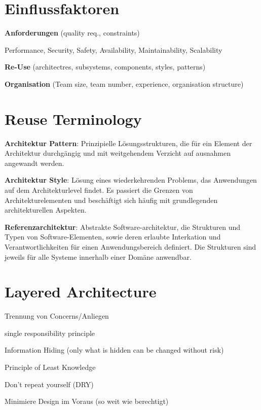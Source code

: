 \section{Einflussfaktoren}
\begin{compactitem}
    \item \textbf{Anforderungen} (quality req., constraints)
    \begin{compactitem}
        \item Performance, Security, Safety, Availability, Maintainability,
        Scalability
    \end{compactitem}
    \item \textbf{Re-Use} (architectres, subsystems, components, styles, patterns)
    \item \textbf{Organisation} (Team size, team number, experience, organisation structure)
\end{compactitem}

\section{Reuse Terminology}
\begin{compactitem}
    \item \textbf{Architektur Pattern}: Prinzipielle Lösungsstrukturen, die für
    ein Element der Architektur durchgängig und mit weitgehendem Verzicht auf
    ausnahmen angewandt werden.
    \item \textbf{Architektur Style}: Lösung eines wiederkehrenden Problems, das
    Anwendungen auf dem Architekturlevel findet. Es passiert die Grenzen von
    Architekturelementen und beschäftigt sich häufig mit grundlegenden architekturellen
    Aspekten.
    \item \textbf{Referenzarchitektur}: Abstrakte Software-architektur, die Strukturen
    und Typen von Software-Elementen, sowie deren erlaubte Interkation und
    Verantwortlichkeiten für einen Anwendungsbereich definiert. Die Strukturen
    sind jeweils für alle Systeme innerhalb einer Domäne anwendbar.
\end{compactitem}

\section{Layered Architecture}
\begin{compactitem}
    \item Trennung von Concerns/Anliegen
    \item single responsibility principle
    \item Information Hiding (only what is hidden can be changed without risk)
    \item Principle of Least Knowledge
    \item Don't repeat yourself (DRY)
    \item Minimiere Design im Voraus (so weit wie berechtigt)
\end{compactitem}

